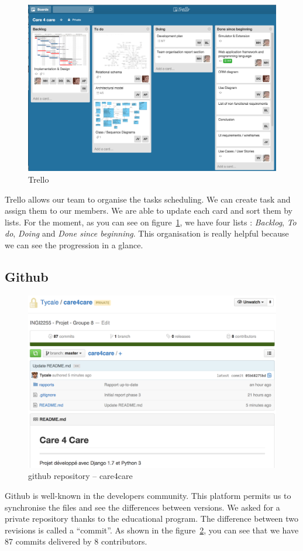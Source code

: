 \documentclass[11pt, a4paper]{article}   	%
\newcommand{\tit}[1]{\textit{#1}}
\begin{document}
\begin{figure}[!ht]
   \includegraphics[width=\textwidth]{trello.png}
   \caption{\label{trello} Trello}
\end{figure}

Trello allows our team to organise the tasks scheduling.
We can create task and assign them to our members.
We are able to update each card and sort them by lists.
For the moment, as you can see on figure~\ref{trello}, we have four lists : \tit{Backlog}, \tit{To do}, \tit{Doing} and \tit{Done since beginning}.
This organisation is really helpful because we can see the progression in a glance.

\subsection{Github} 

\begin{figure}[!ht]
   \includegraphics[width=\textwidth]{github.png}
   \caption{\label{github} github repository – care4care}
\end{figure}

Github is well-known in the developers community.
This platform permits us to synchronise the files and see the differences between versions.
We asked for a private repository thanks to the educational program.
The difference between two revisions is called a \enquote{commit}.
As shown in the figure~\ref{github}, you can see that we have 87 commits delivered by 8 contributors.
\end{document}

